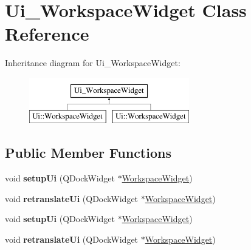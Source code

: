 \hypertarget{class_ui___workspace_widget}{\section{\-Ui\-\_\-\-Workspace\-Widget \-Class \-Reference}
\label{class_ui___workspace_widget}
}
\-Inheritance diagram for \-Ui\-\_\-\-Workspace\-Widget\-:\begin{figure}[H]
\begin{center}
\leavevmode
\includegraphics[height=2.000000cm]{class_ui___workspace_widget}
\end{center}
\end{figure}
\subsection*{\-Public \-Member \-Functions}
\begin{DoxyCompactItemize}
\item 
\hypertarget{class_ui___workspace_widget_ad1df7cde86aef5ef9f263c6d1fd3f2b4}{void {\bfseries setup\-Ui} (\-Q\-Dock\-Widget $\ast$\hyperlink{class_workspace_widget}{\-Workspace\-Widget})}\label{class_ui___workspace_widget_ad1df7cde86aef5ef9f263c6d1fd3f2b4}

\item 
\hypertarget{class_ui___workspace_widget_ae7260490a8c086d6b996d28385a2ab11}{void {\bfseries retranslate\-Ui} (\-Q\-Dock\-Widget $\ast$\hyperlink{class_workspace_widget}{\-Workspace\-Widget})}\label{class_ui___workspace_widget_ae7260490a8c086d6b996d28385a2ab11}

\item 
\hypertarget{class_ui___workspace_widget_ad1df7cde86aef5ef9f263c6d1fd3f2b4}{void {\bfseries setup\-Ui} (\-Q\-Dock\-Widget $\ast$\hyperlink{class_workspace_widget}{\-Workspace\-Widget})}\label{class_ui___workspace_widget_ad1df7cde86aef5ef9f263c6d1fd3f2b4}

\item 
\hypertarget{class_ui___workspace_widget_ae7260490a8c086d6b996d28385a2ab11}{void {\bfseries retranslate\-Ui} (\-Q\-Dock\-Widget $\ast$\hyperlink{class_workspace_widget}{\-Workspace\-Widget})}\label{class_ui___workspace_widget_ae7260490a8c086d6b996d28385a2ab11}

\end{DoxyCompactItemize}
